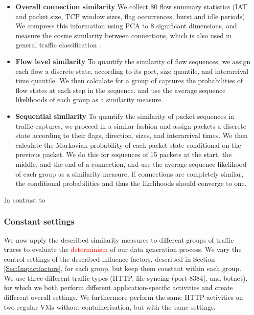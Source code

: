 \documentclass{article}
\begin{document}
\begin{itemize}
\item \textbf{Overall connection similarity} We collect 80 flow summary statistics (IAT and packet size, TCP window sizes, flag occurrences, burst and idle periods). We compress this information using PCA to 8 significant dimensions, and measure the cosine similarity between connections, which is also used in general traffic classification \cite{aun2017review}.
\item \textbf{Flow level similarity} To quantify the similarity of flow sequences, we assign each flow a discrete state, according to its port, size quantile, and interarrival time quantile. We then calculate for a group of captures the probabilities of flow states at each step in the sequence, and use the average sequence likelihoods of each group as a similarity measure. 
\item \textbf{Sequential similarity} To quantify the similarity of packet sequences in traffic captures, we proceed in a similar fashion and assign packets a discrete state according to their flags, direction, sizes, and interarrival times. We then calculate the Markovian probability of each packet state conditional on the previous packet. We do this for sequences of 15 packets at the start, the middle, and the end of a connection, and use the average sequence likelihood of each group as a similarity measure. If connections are completely similar, the conditional probabilities and thus the likelihoods should converge to one.
\end{itemize}

In contrast to 


\subsubsection{Constant settings}

We now apply the described similarity measures to different groups of traffic traces to evaluate the \textcolor{red}{determinism} of our data generation process. We vary the control settings of the described influence factors, described in Section \ref{Sec:Impactfactors}, for each group, but keep them constant within each group. We use three different traffic types (HTTP, file-syncing (port 8384), and botnet), for which we both perform different application-specific activities and create different overall settings. We furthermore perform the same HTTP-activities on two regular VMs without containerisation, but with the same settings.
\end{document}

